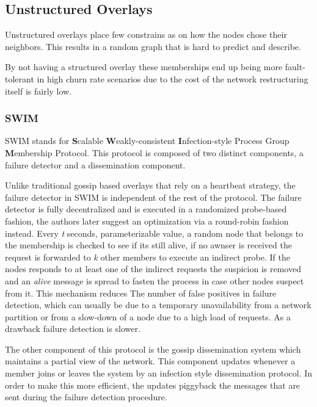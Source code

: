 \subsection{Unstructured Overlays}
\label{sub:unstructured_overlays}

Unstructured overlays place few constrains as on how the nodes chose their
neighbors. This results in a random graph that is hard to predict and describe.

By not having a structured overlay these memberships end up being more fault-tolerant
in high churn rate scenarios due to the cost of the network restructuring
itself is fairly low.

\subsubsection{SWIM}
\label{subsec:swim}

SWIM \cite{swim} stands for \textbf{S}calable \textbf{W}eakly-consistent \textbf{I}nfection-style
Process Group \textbf{M}embership Protocol. This protocol is composed of two distinct
components, a failure detector and a dissemination component.

Unlike traditional gossip based overlays that rely on a heartbeat strategy,
the failure detector in SWIM is independent of the rest of the protocol.
The failure detector is fully decentralized and is executed in a randomized
probe-based fashion, the authors later suggest an optimization via a round-robin
fashion instead. Every \textit{t} seconds, parameterizable value, a random
node that belongs to the membership is checked to see if its still alive, if
no awnser is received the request is forwarded to \textit{k} other members to
execute an indirect probe. If the nodes responds to at least one of the indirect
requests the suspicion is removed and an \textit{alive} message is spread to
fasten the process in case other nodes suspect from it.  This mechanism reduces The
number of false positives in failure detection, which can usually be due to a
temporary unavailability from a network partition or from a slow-down of a node
due to a high load of requests. As a drawback failure detection is slower.

The other component of this protocol is the gossip dissemination system which
maintains a partial view of the network. This component updates whenever a member
joins or leaves the system by an infection style dissemination protocol. In order to
make this more efficient, the updates piggyback the messages that are sent during the
failure detection procedure.

